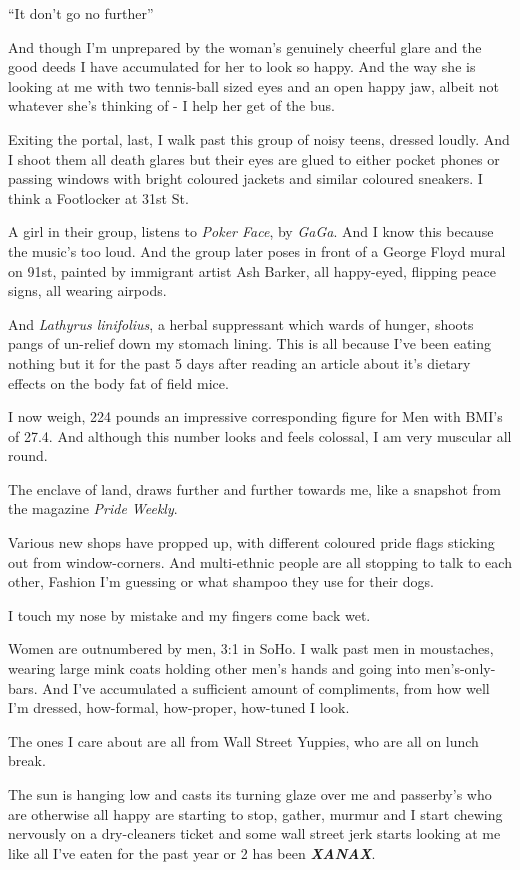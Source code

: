 \documentclass[19pt,openany]{book}
\begin{document}
``It don't go no further''

And though I'm unprepared
by the woman's genuinely
cheerful glare and the good deeds
I have accumulated for her
to look so happy. And the way
she is looking at me with two
tennis-ball sized eyes and
an open happy jaw, albeit not
whatever she's thinking of - I help
her get of the bus.

Exiting the portal, last,
I walk past this group of noisy
teens, dressed loudly. And I shoot
them all death glares
but their eyes are glued
to either pocket phones or passing
windows with bright coloured jackets
and similar coloured sneakers. I think a Footlocker
at 31st St.

A girl in their group,
listens to \textit{Poker Face},
by \textit{GaGa}.
And I know this because the
music's too loud. And the group
later poses in front of a George
Floyd mural on 91st, painted by immigrant artist
Ash Barker, all happy-eyed, flipping
peace signs, all wearing airpods.

And \textit{Lathyrus linifolius},
a herbal suppressant which wards of hunger, shoots pangs
of un-relief down my stomach lining. This is all because
I've been eating nothing but it for the past 5 days after
reading an article about it's dietary
effects on the body fat of field mice.

I now weigh, 224 pounds an impressive corresponding
figure for Men with BMI's of 27.4. And although
this number looks and feels colossal, I am very muscular
all round.

The enclave of land,
draws further and further towards me,
like a snapshot from the magazine \textit{Pride Weekly}.

Various new shops have propped up, with different
coloured pride flags sticking out from window-corners.
And multi-ethnic people are all stopping to talk to each
other, Fashion I'm guessing or what shampoo they use
for their dogs.

I touch my nose by mistake and
my fingers come back wet.

Women are outnumbered by men, 3:1 in SoHo.
I walk past men in moustaches, wearing large mink
coats holding other men's hands and going into
men's-only-bars. And I've accumulated a
sufficient amount of compliments, from how
well I'm dressed, how-formal, how-proper,
how-tuned I look.

The ones I care about
are all from Wall Street Yuppies, who
are all on lunch break.

The sun is hanging low and casts
its turning glaze over me and passerby's
who are otherwise all happy
are starting to stop, gather, murmur
and I start chewing nervously on a
dry-cleaners ticket and some wall street
jerk starts looking at me
like all I've eaten
for the past year or 2 has been
\textit{\textbf{XANAX}}.
\end{document}

